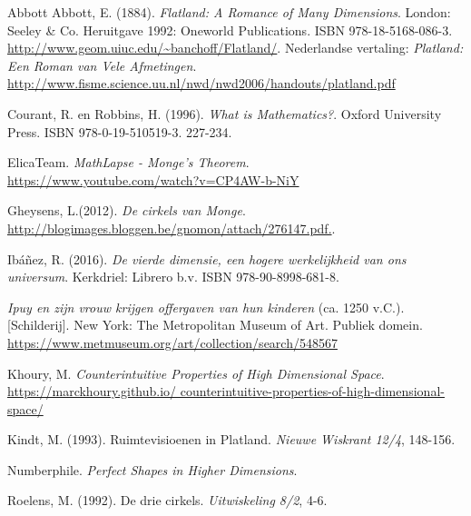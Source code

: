 \stopcontents[mainsections]			        %


\begin{bronnen}
\item Abbott Abbott, E. (1884). \emph{Flatland: A Romance of Many Dimensions}. London:  Seeley \& Co. Heruitgave 1992: Oneworld Publications. ISBN 978-18-5168-086-3.   \url{http://www.geom.uiuc.edu/~banchoff/Flatland/}. Nederlandse vertaling: 
 \emph{Platland: Een Roman van Vele Afmetingen}.   \url{http://www.fisme.science.uu.nl/nwd/nwd2006/handouts/platland.pdf}
 
\item Courant, R. en Robbins, H. (1996). \emph{What is Mathematics?}. Oxford University Press. ISBN 978-0-19-510519-3. 227-234.

\item ElicaTeam. \emph{MathLapse - Monge's Theorem}.\\ \url{https://www.youtube.com/watch?v=CP4AW-b-NiY}

\item Gheysens, L.(2012). \emph{De cirkels van Monge}. \\ \url{http://blogimages.bloggen.be/gnomon/attach/276147.pdf.}.

\item Ib\'a\~{n}ez, R. (2016). \emph{De vierde dimensie, een hogere werkelijkheid van ons universum}. Kerkdriel: Librero b.v. ISBN 978-90-8998-681-8.

\item \emph{Ipuy en zijn vrouw krijgen offergaven van hun kinderen} (ca. 1250 v.C.). [Schilderij]. New York: The Metropolitan Museum of Art. Publiek domein. \url{https://www.metmuseum.org/art/collection/search/548567}

\item Khoury, M. \emph{Counterintuitive Properties of High Dimensional Space}.\\ \url{https://marckhoury.github.io/ counterintuitive-properties-of-high-dimensional-space/}

\item Kindt, M. (1993). Ruimtevisioenen in Platland. \emph{Nieuwe Wiskrant 12/4}, 148-156.

\item Numberphile. \emph{Perfect Shapes in Higher Dimensions}.\\

\item Roelens, M. (1992). De drie cirkels. \emph{Uitwiskeling 8/2}, 4-6.


\end{bronnen}
